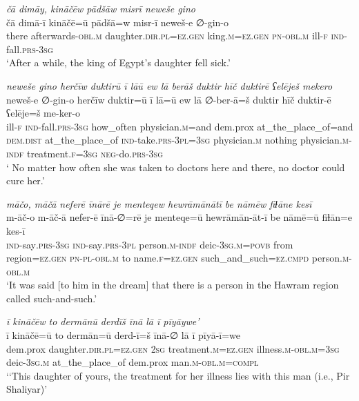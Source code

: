 \ea \label{ZP.25}
\textit{čā dimāy, kināčēw pādšāw misrī neweše gino} \\ 
\gll čā dimā-ī kināčē=ū pādšā=w misr-ī neweš-e ∅-gin-o \\ 
 there afterwards\textsc{-obl}\textsc{.m} daughter\textsc{.dir}\textsc{.pl}\textsc{\textsc{=ez.gen}} king\textsc{.m}\textsc{\textsc{=ez.gen}} \textsc{pn}\textsc{-obl}\textsc{.m} ill\textsc{-f} \textsc{ind-}fall\textsc{.prs}\textsc{-3sg} \\ 
\glt `After a while, the king of Egypt’s daughter fell sick.'
\z 
 
\ea \label{ZP.26}
\textit{neweše gino herčīw duktirū ī lāū ew lā berāš duktir hīč duktirē ʕelēješ mekero} \\ 
\gll neweš-e ∅-gin-o herčīw duktir=ū ī lā=ū ew lā ∅-ber-ā=š duktir hīč duktir-ē ʕelēje=š me-ker-o \\ 
 ill\textsc{-f} \textsc{ind-}fall\textsc{.prs}\textsc{-3sg} how\_often physician\textsc{.m}=and dem.prox at\_the\_place\_of=and \textsc{dem.dist} at\_the\_place\_of \textsc{ind-}take\textsc{.prs}\textsc{-3pl}\textsc{=3sg} physician\textsc{.m} nothing physician\textsc{.m}\textsc{-indf} treatment\textsc{.f}\textsc{=3sg} \textsc{neg-}do\textsc{.prs}\textsc{-3sg} \\ 
\glt ` No matter how often she was taken to doctors here and there, no doctor could cure her.'
\z 
 
\ea \label{ZP.31}
\textit{māčo, māčā neferē īnārē je menteqew hewrāmānātī be nāmēw fiɫāne kesī} \\ 
\gll m-āč-o m-āč-ā nefer-ē īnā-∅=rē je menteqe=ū hewrāmān-āt-ī be nāmē=ū fiɫān=e kes-ī \\ 
 \textsc{ind-}say\textsc{.prs}\textsc{-3sg} \textsc{ind-}say\textsc{.prs}\textsc{-3pl} person\textsc{.m}\textsc{-indf} deic\textsc{-3sg}\textsc{.m}\textsc{=\textsc{povb}} from region\textsc{\textsc{=ez.gen}} \textsc{pn}\textsc{\textsc{-pl}}\textsc{-obl}\textsc{.m} to name\textsc{.f}\textsc{\textsc{=ez.gen}} such\_and\_such\textsc{=ez}\textsc{.cmpd} person\textsc{.m}\textsc{-obl}\textsc{.m} \\ 
\glt `It was said [to him in the dream] that there is a person in the Hawram region called such-and-such.'
\z 
 
\ea \label{ZP.33}
\textit{ī kināčēw to dermānū derdīš īnā lā ī pīyāywe’} \\ 
\gll ī kināčē=ū to dermān=ū derd-ī=š īnā-∅ lā ī pīyā-ī=we \\ 
 dem.prox daughter\textsc{.dir}\textsc{.pl}\textsc{\textsc{=ez.gen}} \textsc{2sg} treatment\textsc{.m}\textsc{\textsc{=ez.gen}} illness\textsc{.m}\textsc{-obl}\textsc{.m}\textsc{=3sg} deic\textsc{-3sg}\textsc{.m} at\_the\_place\_of dem.prox man\textsc{.m}\textsc{-obl}\textsc{.m}\textsc{=compl} \\ 
\glt `‘This daughter of yours, the treatment for her illness lies with this man (i.e., Pir Shaliyar)'
\z 
 
